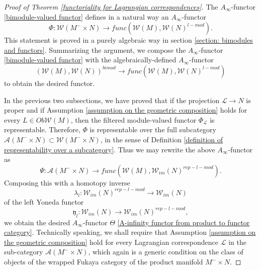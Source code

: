 \documentclass{amsart}
\numberwithin{equation}{section}
\numberwithin{figure}{section}
\begin{document}
\begin{proof}[Proof of Theorem \ref{functoriality for Lagrangian correspondences}]
	The $A_{\infty}$-functor \eqref{bimodule-valued functor} defines in a natural way an $A_{\infty}$-functor
\begin{equation}
\Phi: \mathcal{W}(M^{-} \times N) \to func(\mathcal{W}(M), \mathcal{W}(N)^{l-mod}).
\end{equation}
This statement is proved in a purely algebraic way in section \ref{section: bimodules and functors}. Summarizing the argument, we compose the $A_{\infty}$-functor \eqref{bimodule-valued functor}  with the algebraically-defined $A_{\infty}$-functor 
\begin{equation}
(\mathcal{W}(M), \mathcal{W}(N))^{bimod} \to func(\mathcal{W}(M), \mathcal{W}(N)^{l-mod})
\end{equation}
to obtain the desired functor. \par
	In the previous two subsections, we have proved that if the projection $\mathcal{L} \to N$ is proper and if Assumption \ref{assumption on the geometric composition} holds for every $L \in Ob \mathcal{W}(M)$, then the filtered module-valued functor $\Phi_{\mathcal{L}}$ is representable. Therefore, $\Phi$ is representable over the full subcategory $\mathcal{A}(M^{-} \times N) \subset \mathcal{W}(M^{-} \times N)$, in the sense of Definition \ref{definition of representability over a subcategory}. Thus we may rewrite the above $A_{\infty}$-functor as
\begin{equation}
\Psi: \mathcal{A}(M^{-} \times N) \to func(\mathcal{W}(M), \mathcal{W}_{im}(N)^{rep-l-mod}).
\end{equation}
Composing this with a homotopy inverse
\begin{equation*}
\lambda_{l}: \mathcal{W}_{im}(N)^{rep-l-mod} \to \mathcal{W}_{im}(N)
\end{equation*}
of the left Yoneda functor
\begin{equation*}
\mathfrak{y}_{l}: \mathcal{W}_{im}(N) \to \mathcal{W}_{im}(N)^{rep-l-mod},
\end{equation*}
we obtain the desired $A_{\infty}$-functor $\Theta$ \eqref{A-infinity functor from product to functor category}. Technically speaking, we shall require that Assumption \ref{assumption on the geometric composition} hold for every Lagrangian correspondence $\mathcal{L}$ in the sub-category $\mathcal{A}(M^{-} \times N)$, which again is a generic condition on the class of objects of the wrapped Fukaya category of the product manifold $M^{-} \times N$. \par
\end{proof}
\end{document}
